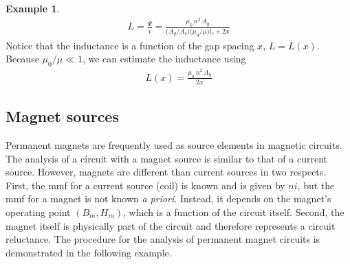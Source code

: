 \documentclass[11pt,a4paper,oneside]{book}
\numberwithin{equation}{section}
\theoremstyle{it}
\theoremstyle{definition}
\newtheorem{example}{Example}[section]
\begin{document}
\begin{example}
\begin{equation*}
	{\begin{aligned}
			L=\frac{\Psi}{i}=\frac{\mu_0\,n^2\,A_g}{\Big(A_g/A_c\Big)\Big(\mu_0/\mu\Big)l_c+2x}
	\end{aligned}}
\end{equation*}
Notice that the inductance is a function of the gap spacing $x$, $L=L(x)$. Because $\mu_0/\mu\ll1$, we can estimate the inductance using
 \begin{equation*}\label{}
 	{\begin{aligned}
 			L(x)=\frac{\mu_0\,n^2\,A_g}{2x}
 	\end{aligned}}
 \end{equation*}
\end{example}

\subsection{Magnet sources}
Permanent magnets are frequently used as source elements in magnetic circuits. The analysis of a circuit with a magnet source is similar to that of a current source. However, magnets are different than current sources in two respects. First, the mmf for a current source (coil) is known and is given by $ni$, but the mmf for a magnet is not known \textit{a priori}. Instead, it depends on the magnet's operating point $(B_m,H_m)$, which is a function of the circuit itself. Second, the magnet itself is physically part of the circuit and therefore represents a circuit reluctance. The procedure for the analysis of permanent magnet circuits is demonstrated in the following example.
\end{document}
